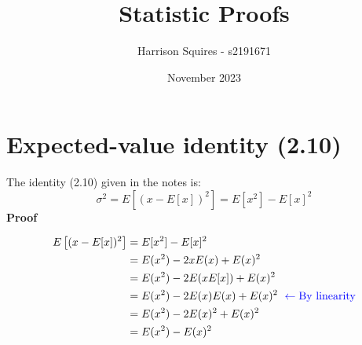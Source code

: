 \documentclass{article}
\title{Statistic Proofs}
\author{Harrison Squires - s2191671}
\date{November 2023}
\begin{document}
\maketitle
\thispagestyle{empty}



\tableofcontents
\thispagestyle{empty}



\newpage
\clearpage
{} 
\section{Expected-value identity (2.10)}
The identity (2.10) given in the notes is:
\begin{equation*}
    \sigma^2 = E\left[(x-E[x])^2\right] = E[x^2]-E[x]^2
\end{equation*}
\textbf{Proof}

\begin{align*}
     E\left[(x-E[x])^2\right] &= E[x^2]-E[x]^2\\
     &=E(x^2)-2xE(x)+E(x)^2 \\
     &=E(x^2)-2E(xE[x])+E(x)^2 \\
     &= E(x^2) -2E(x)E(x)+E(x)^2 \ \color{blue} \leftarrow \text{By linearity} \\
     &=E(x^2)-2E(x)^2+E(x)^2 \\
     &=E(x^2)-E(x)^2
\end{align*}
\end{document}
